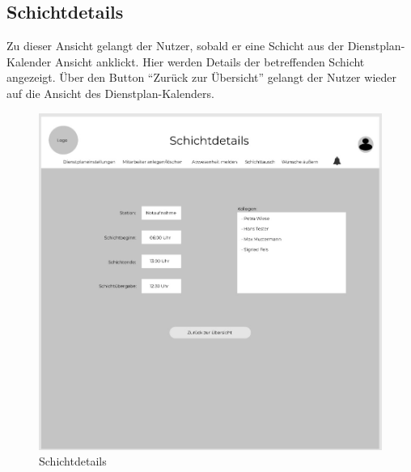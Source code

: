 \documentclass[11pt,
paper=a4,
bibtotocnumbered,	  %
liststotocnumbered,  %
DIV=calc,		  %
tablecaptionabove,	  %
headinclude,
]{article}
\begin{document}
\subsection{Schichtdetails}
Zu dieser Ansicht gelangt der Nutzer, sobald er eine Schicht aus der Dienstplan-Kalender Ansicht anklickt. Hier werden Details der betreffenden Schicht angezeigt. Über den Button “Zurück zur Übersicht” gelangt der Nutzer wieder auf die Ansicht des Dienstplan-Kalenders. 
\begin{figure}[H]
\includegraphics[scale=1]{Bilder/Schichtdetails.jpg}
\caption{Schichtdetails}
\end{figure}
\end{document}
